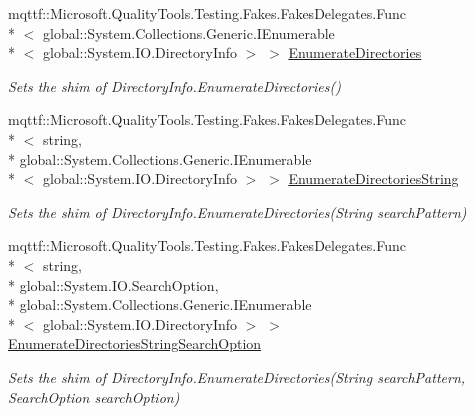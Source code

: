 \begin{DoxyCompactItemize}
mqttf\-::\-Microsoft.\-Quality\-Tools.\-Testing.\-Fakes.\-Fakes\-Delegates.\-Func\\*
$<$ global\-::\-System.\-Collections.\-Generic.\-I\-Enumerable\\*
$<$ global\-::\-System.\-I\-O.\-Directory\-Info $>$ $>$ \hyperlink{class_system_1_1_i_o_1_1_fakes_1_1_shim_directory_info_af1b3b7df27c901bac249bc6300c21ebc}{Enumerate\-Directories}
\begin{DoxyCompactList}\small\item\em Sets the shim of Directory\-Info.\-Enumerate\-Directories()\end{DoxyCompactList}\item 
mqttf\-::\-Microsoft.\-Quality\-Tools.\-Testing.\-Fakes.\-Fakes\-Delegates.\-Func\\*
$<$ string, \\*
global\-::\-System.\-Collections.\-Generic.\-I\-Enumerable\\*
$<$ global\-::\-System.\-I\-O.\-Directory\-Info $>$ $>$ \hyperlink{class_system_1_1_i_o_1_1_fakes_1_1_shim_directory_info_a428b4c438938e7a6aabfb56a388ab480}{Enumerate\-Directories\-String}
\begin{DoxyCompactList}\small\item\em Sets the shim of Directory\-Info.\-Enumerate\-Directories(\-String search\-Pattern)\end{DoxyCompactList}\item 
mqttf\-::\-Microsoft.\-Quality\-Tools.\-Testing.\-Fakes.\-Fakes\-Delegates.\-Func\\*
$<$ string, \\*
global\-::\-System.\-I\-O.\-Search\-Option, \\*
global\-::\-System.\-Collections.\-Generic.\-I\-Enumerable\\*
$<$ global\-::\-System.\-I\-O.\-Directory\-Info $>$ $>$ \hyperlink{class_system_1_1_i_o_1_1_fakes_1_1_shim_directory_info_a66792f9a6cccd9b875e70f21ccdf0678}{Enumerate\-Directories\-String\-Search\-Option}
\begin{DoxyCompactList}\small\item\em Sets the shim of Directory\-Info.\-Enumerate\-Directories(\-String search\-Pattern, Search\-Option search\-Option)\end{DoxyCompactList}\item 

\end{DoxyCompactItemize}
